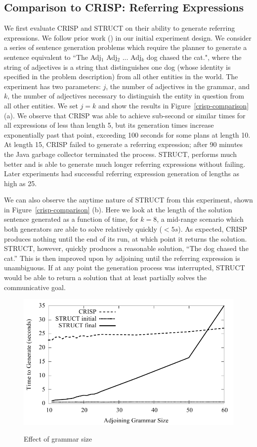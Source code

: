 \subsection{Comparison to CRISP: Referring Expressions}
We first evaluate CRISP and STRUCT on their ability to generate
referring expressions. We follow prior work (\cite{koller_experiences_2011})
in our initial experiment design.  We consider a series of sentence
generation problems which require the planner to generate a sentence
equivalent to ``The Adj$_1$ Adj$_2$ ... Adj$_k$ dog chased the cat.",
where the string of adjectives is a string that distinguishes one
dog (whose identity is specified in the problem description) from
all other entities in the world.
The experiment has two parameters: $j$, the number of adjectives in
the grammar, and $k$, the number of adjectives necessary to
distinguish the entity in question from all other entities. We set $j
= k$ and show the results in Figure~\ref{crisp-comparison} (a).
We observe that CRISP was able to achieve
sub-second or similar times for all expressions of less than length 5, but its
generation times increase exponentially past that point, exceeding 100
seconds for some plans at length 10. At length 15, CRISP failed to
generate a referring expression; after 90 minutes the Java garbage
collector terminated the process. STRUCT, performs much better and
is able to generate much longer referring expressions without failing.
Later experiments had successful referring expression generation of lengths
as high as 25.

We can also observe the anytime nature of STRUCT from this experiment,
shown in Figure~\ref{crisp-comparison} (b).  Here we look at the
length of the solution sentence generated as a function of time, for
$k=8$, a mid-range scenario which both generators are able to solve
relatively quickly ($< 5s$).  As expected, CRISP produces nothing until
the end of its run, at which point it returns the solution. STRUCT,
however, quickly produces a reasonable solution, ``The dog chased the
cat.''  This is then improved upon by adjoining until the referring
expression is unambiguous. If at any point the generation process was
interrupted, STRUCT would be able to return a solution that at least
partially solves the communicative goal.

\begin{figure}
\centering
\includegraphics[width=0.7 \linewidth]{../analysis/plots/large-grammar/large-grammar.pdf}
\label{graph-large-grammars}
\caption{Effect of grammar size}
\end{figure}

